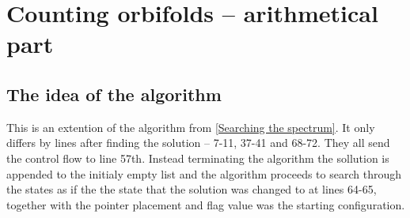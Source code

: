 \chapter{Counting orbifolds -- arithmetical part}\label{Counting orbifolds -- arithmetical part}





\section{The idea of the algorithm}
This is an extention of the algorithm from \ref{Searching the spectrum}. It only differs by 
lines after finding the solution -- 7-11, 37-41 and 68-72. They all send the control flow 
to line 57th.
Instead terminating the algorithm the sollution is appended to the 
initialy empty list and the algorithm proceeds to search through the states as if the 
the state that the solution was changed to 
at lines 64-65, together with the pointer placement and flag value was  
the starting configuration. 

